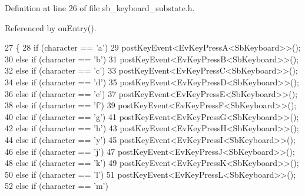 Definition at line 26 of file sb\+\_\+keyboard\+\_\+substate.\+h.



Referenced by on\+Entry().


\begin{DoxyCode}
27         \{
28                 \textcolor{keywordflow}{if} (character == \textcolor{charliteral}{'a'})
29                         postKeyEvent<EvKeyPressA<SbKeyboard>>();
30                 \textcolor{keywordflow}{else} \textcolor{keywordflow}{if} (character == \textcolor{charliteral}{'b'})
31                         postKeyEvent<EvKeyPressB<SbKeyboard>>();
32                 \textcolor{keywordflow}{else} \textcolor{keywordflow}{if} (character == \textcolor{charliteral}{'c'})
33                         postKeyEvent<EvKeyPressC<SbKeyboard>>();
34                 \textcolor{keywordflow}{else} \textcolor{keywordflow}{if} (character == \textcolor{charliteral}{'d'})
35                         postKeyEvent<EvKeyPressD<SbKeyboard>>();
36                 \textcolor{keywordflow}{else} \textcolor{keywordflow}{if} (character == \textcolor{charliteral}{'e'})
37                         postKeyEvent<EvKeyPressE<SbKeyboard>>();
38                 \textcolor{keywordflow}{else} \textcolor{keywordflow}{if} (character == \textcolor{charliteral}{'f'})
39                         postKeyEvent<EvKeyPressF<SbKeyboard>>();
40                 \textcolor{keywordflow}{else} \textcolor{keywordflow}{if} (character == \textcolor{charliteral}{'g'})
41                         postKeyEvent<EvKeyPressG<SbKeyboard>>();
42                 \textcolor{keywordflow}{else} \textcolor{keywordflow}{if} (character == \textcolor{charliteral}{'h'})
43                         postKeyEvent<EvKeyPressH<SbKeyboard>>();
44                 \textcolor{keywordflow}{else} \textcolor{keywordflow}{if} (character == \textcolor{charliteral}{'y'})
45                         postKeyEvent<EvKeyPressI<SbKeyboard>>();
46                 \textcolor{keywordflow}{else} \textcolor{keywordflow}{if} (character == \textcolor{charliteral}{'j'})
47                         postKeyEvent<EvKeyPressJ<SbKeyboard>>();
48                 \textcolor{keywordflow}{else} \textcolor{keywordflow}{if} (character == \textcolor{charliteral}{'k'})
49                         postKeyEvent<EvKeyPressK<SbKeyboard>>();
50                 \textcolor{keywordflow}{else} \textcolor{keywordflow}{if} (character == \textcolor{charliteral}{'l'})
51                         postKeyEvent<EvKeyPressL<SbKeyboard>>();
52                 \textcolor{keywordflow}{else} \textcolor{keywordflow}{if} (character == \textcolor{charliteral}{'m'})

\end{DoxyCode}
